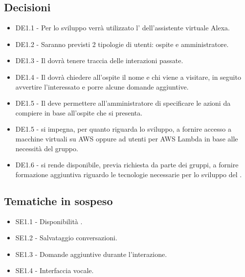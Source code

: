 \documentclass[a4paper,titlepage]{article}
\begin{document}
 \subsection{Decisioni}
 \begin{itemize}
  \item DE1.1 - Per lo sviluppo verrà utilizzato l' dell'assistente virtuale Alexa.
  \item DE1.2 - Saranno previsti 2 tipologie di utenti: ospite e amministratore.
  \item DE1.3 - Il  dovrà tenere traccia delle interazioni passate.
  \item DE1.4 - Il  dovrà chiedere all'ospite il nome e chi viene a visitare, in seguito avvertire l'interessato e porre alcune domande aggiuntive.
  \item DE1.5 - Il  deve permettere all'amministratore di specificare le azioni da compiere in base all'ospite che si presenta.
  \item DE1.5 - \PROPONENTE{} si impegna, per quanto riguarda lo sviluppo, a fornire accesso a macchine virtuali su AWS oppure ad utenti per AWS Lambda in base alle necessità del gruppo.
  \item DE1.6 - \PROPONENTE{} si rende disponibile, previa richiesta da parte dei gruppi, a fornire formazione aggiuntiva riguardo le tecnologie necessarie per lo sviluppo del .
 \end{itemize}

\subsection{Tematiche in sospeso}
  \begin{itemize}
  \item SE1.1 - Disponibilità .
  \item SE1.2 - Salvataggio conversazioni.
  \item SE1.3 - Domande aggiuntive durante l'interazione.
  \item SE1.4 - Interfaccia vocale.
  \end{itemize}
\end{document}
